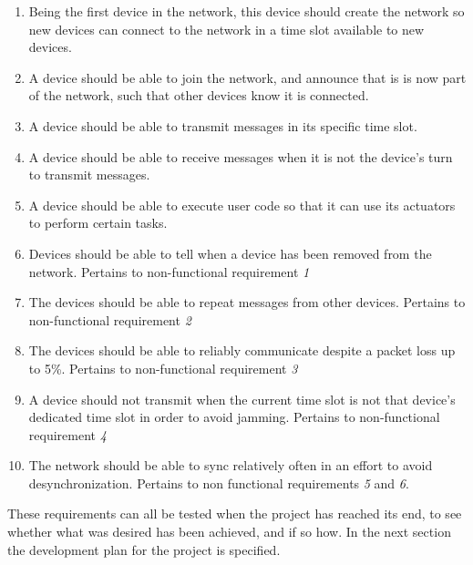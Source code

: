 \begin{enumerate}[label=\itshape \alph*\upshape)]
    \item Being the first device in the network, this device should create the network so new devices can connect to the network in a time slot available to new devices. 
    \item A device should be able to join the network, and announce that is is now part of the network, such that other devices know it is connected.
    \item A device should be able to transmit messages in its specific time slot.
    \item A device should be able to receive messages when it is not the device's turn to transmit messages.
    \item A device should be able to execute user code so that it can use its actuators to perform certain tasks.
    \item Devices should be able to tell when a device has been removed from the network. Pertains to non-functional requirement \textit{1}
    \item The devices should be able to repeat messages from other devices. Pertains to non-functional requirement \textit{2}
    \item The devices should be able to reliably communicate despite a packet loss up to 5\%. Pertains to non-functional requirement \textit{3} 
    \item A device should not transmit when the current time slot is not that device's dedicated time slot in order to avoid jamming. Pertains to non-functional requirement \textit{4}
    \item The network should be able to sync relatively often in an effort to avoid desynchronization. Pertains to non functional requirements \textit{5} and \textit{6}.
\end{enumerate}
\noindent
These requirements can all be tested when the project has reached its end, to see whether what was desired has been achieved, and if so how. 
In the next section the development plan for the project is specified.

